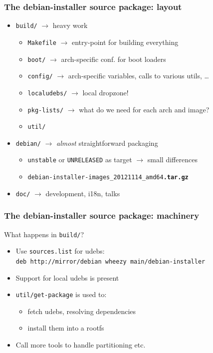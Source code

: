 \documentclass[handout]{beamer}
\begin{document}
\begin{frame}[fragile]
  \frametitle{The debian-installer source package: layout}

  \begin{itemize}
  \item \texttt{build/} $\rightarrow$ heavy work
    \begin{itemize}
    \item \texttt{Makefile} $\rightarrow$ entry-point for building everything
    \item \texttt{boot/} $\rightarrow$ arch-specific conf. for boot loaders
    \item \texttt{config/} $\rightarrow$ arch-specific variables, calls to various utils, …
    \item \texttt{localudebs/} $\rightarrow$ local dropzone!
    \item \texttt{pkg-lists/} $\rightarrow$ what do we need for each arch and image?
    \item \texttt{util/}
    \end{itemize}
  \pause
  \item \texttt{debian/} $\rightarrow$ \textsl{almost} straightforward packaging
    \begin{itemize}
    \item \texttt{unstable} or \texttt{UNRELEASED} as target $\rightarrow$ small differences
    \item \texttt{debian-installer-images\_20121114\_amd64\textbf{.tar.gz}}
    \end{itemize}
  \pause
  \item \texttt{doc/} $\rightarrow$ development, i18n, talks
  \end{itemize}
\end{frame}

\begin{frame}[fragile]
  \frametitle{The debian-installer source package: machinery}

  What happens in \texttt{build/}?
  \begin{itemize}
  \item Use \texttt{sources.list} for udebs:\\
    \texttt{\small deb http://mirror/debian wheezy main/debian-installer}
  \item Support for local udebs is present
  \item \texttt{util/get-package} is used to:
    \begin{itemize}
    \item fetch udebs, resolving dependencies
    \item install them into a rootfs
    \end{itemize}
  \item Call more tools to handle partitioning etc.
  \end{itemize}
\end{frame}
\end{document}
